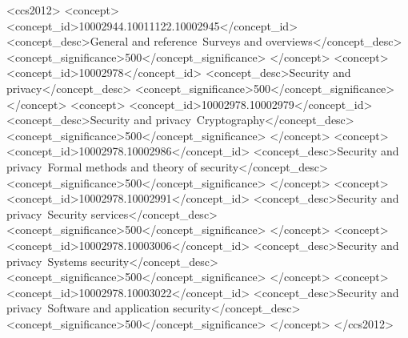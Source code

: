 
\begin{CCSXML}
    <ccs2012>
    <concept>
        <concept_id>10002944.10011122.10002945</concept_id>
        <concept_desc>General and reference~Surveys and overviews</concept_desc>
        <concept_significance>500</concept_significance>
    </concept>
    <concept>
        <concept_id>10002978</concept_id>
        <concept_desc>Security and privacy</concept_desc>
        <concept_significance>500</concept_significance>
    </concept>
    <concept>
        <concept_id>10002978.10002979</concept_id>
        <concept_desc>Security and privacy~Cryptography</concept_desc>
        <concept_significance>500</concept_significance>
    </concept>
    <concept>
        <concept_id>10002978.10002986</concept_id>
        <concept_desc>Security and privacy~Formal methods and theory of security</concept_desc>
        <concept_significance>500</concept_significance>
    </concept>
    <concept>
        <concept_id>10002978.10002991</concept_id>
        <concept_desc>Security and privacy~Security services</concept_desc>
        <concept_significance>500</concept_significance>
    </concept>
    <concept>
        <concept_id>10002978.10003006</concept_id>
        <concept_desc>Security and privacy~Systems security</concept_desc>
        <concept_significance>500</concept_significance>
    </concept>
    <concept>
        <concept_id>10002978.10003022</concept_id>
        <concept_desc>Security and privacy~Software and application security</concept_desc>
        <concept_significance>500</concept_significance>
    </concept>
    </ccs2012>
\end{CCSXML}



